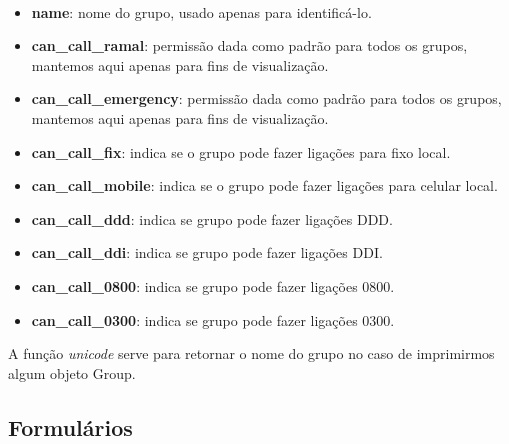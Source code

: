 \documentclass[letterpaper,10pt,brazil]{sphinxmanual}
\begin{document}
\begin{fulllineitems}
\label{apps/groups:groups.models.Group}~\begin{itemize}
\item {} 
\textbf{name}: nome do grupo, usado apenas para identificá-lo.

\item {} 
\textbf{can\_call\_ramal}: permissão dada como padrão para todos os grupos, mantemos aqui apenas para fins de visualização.

\item {} 
\textbf{can\_call\_emergency}: permissão dada como padrão para todos os grupos, mantemos aqui apenas para fins de visualização.

\item {} 
\textbf{can\_call\_fix}: indica se o grupo pode fazer ligações para fixo local.

\item {} 
\textbf{can\_call\_mobile}: indica se o grupo pode fazer ligações para celular local.

\item {} 
\textbf{can\_call\_ddd}: indica se grupo pode fazer ligações DDD.

\item {} 
\textbf{can\_call\_ddi}: indica se grupo pode fazer ligações DDI.

\item {} 
\textbf{can\_call\_0800}: indica se grupo pode fazer ligações 0800.

\item {} 
\textbf{can\_call\_0300}: indica se grupo pode fazer ligações 0300.

\end{itemize}

A função \emph{unicode} serve para retornar o nome do grupo no caso de imprimirmos algum objeto Group.

\end{fulllineitems}



\subsection{Formulários}
\label{apps/groups:module-groups.forms}\label{apps/groups:formularios}

\begin{fulllineitems}
\label{apps/groups:groups.forms.GroupForm}
\end{fulllineitems}
\end{document}
